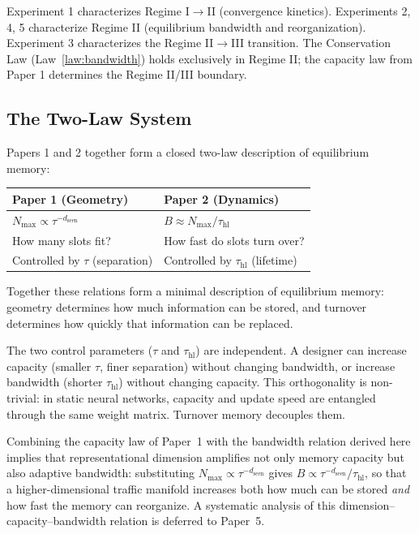 \documentclass[11pt]{article}
\begin{document}
Experiment 1 characterizes Regime I$\to$II (convergence kinetics).
Experiments 2, 4, 5 characterize Regime II (equilibrium bandwidth and reorganization).
Experiment 3 characterizes the Regime II$\to$III transition.
The Conservation Law (Law~\ref{law:bandwidth}) holds exclusively in Regime II;
the capacity law from Paper 1 determines the Regime II/III boundary.

\subsection{The Two-Law System}

Papers 1 and 2 together form a closed two-law description of equilibrium memory:

\begin{center}
\begin{tabular}{ll}
\toprule
\textbf{Paper 1 (Geometry)} & \textbf{Paper 2 (Dynamics)} \\
\midrule
$N_{\max} \propto \tau^{-d_{\text{seen}}}$ & $B \approx N_{\max} / \tau_{\text{hl}}$ \\
How many slots fit? & How fast do slots turn over? \\
Controlled by $\tau$ (separation) & Controlled by $\tau_{\text{hl}}$ (lifetime) \\
\bottomrule
\end{tabular}
\end{center}

Together these relations form a minimal description of equilibrium memory: geometry determines how much information can be stored, and turnover determines how quickly that information can be replaced.

The two control parameters ($\tau$ and $\tau_{\text{hl}}$) are independent.
A designer can increase capacity (smaller $\tau$, finer separation) without changing bandwidth,
or increase bandwidth (shorter $\tau_{\text{hl}}$) without changing capacity.
This orthogonality is non-trivial: in static neural networks, capacity and update speed are
entangled through the same weight matrix. Turnover memory decouples them.

Combining the capacity law of Paper~1 with the bandwidth relation derived here implies that
representational dimension amplifies not only memory capacity but also adaptive bandwidth:
substituting $N_{\max} \propto \tau^{-d_{\text{seen}}}$ gives $B \propto \tau^{-d_{\text{seen}}} / \tau_{\text{hl}}$,
so that a higher-dimensional traffic manifold increases both how much can be stored \emph{and}
how fast the memory can reorganize. A systematic analysis of this dimension--capacity--bandwidth
relation is deferred to Paper~5.
\end{document}
